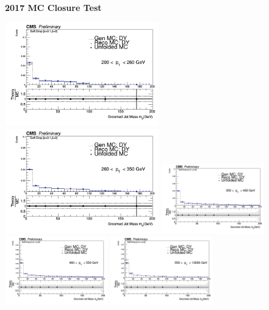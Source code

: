 \documentclass{beamer}
\begin{document}
\begin{frame}{\textbf{2017 MC Closure Test}}

\includegraphics[width=0.5\textwidth]{Oct31_unfoldPlots_sdB0/Output_NoReg_MC_ptbin1MC_mass_Ptbin200to260_Detbinning_Groomingis_sdB0.png}%
\includegraphics[width=0.5\textwidth]{Oct31_unfoldPlots_sdB0/Output_NoReg_MC_ptbin2MC_mass_Ptbin260to350_Detbinning_Groomingis_sdB0.png}
\newline
\includegraphics[width=0.3333\textwidth]{Oct31_unfoldPlots_sdB0/Output_NoReg_MC_ptbin3MC_mass_Ptbin350to460_Detbinning_Groomingis_sdB0.png}%
\includegraphics[width=0.3333\textwidth]{Oct31_unfoldPlots_sdB0/Output_NoReg_MC_ptbin4MC_mass_Ptbin460to550_Detbinning_Groomingis_sdB0.png}
\includegraphics[width=0.3333\textwidth]{Oct31_unfoldPlots_sdB0/Output_NoReg_MC_ptbin5MC_mass_Ptbin550to13000_Detbinning_Groomingis_sdB0.png}





\end{frame}
\end{document}
